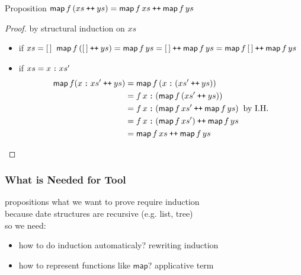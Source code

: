 \documentclass[12pt,aspectratio=169]{beamer}
\newcommand{\m}[1]{\mathsf{#1}}
\newcommand\catenate{\mathbin{\text{\ttfamily\upshape ++}}}
\newcommand\cons{\mathbin{\text{\ttfamily\upshape :}}}
\begin{document}
\begin{frame}
    \begin{block}{Proposition}
        $\m{map}\,f\,(xs \catenate ys) = \m{map} \, f \, xs \catenate \m{map}\,f\,ys$
    \end{block}
    \begin{proof}
        by structural induction on $xs$
        \begin{itemize}
            \item if $xs = [\,]$ $\m{map}\,f\,(\nil \catenate ys) = \m{map}\, f \,ys
                = \nil \catenate \m{map}\,f\,ys = \m{map}\,f\,\nil \catenate \m{map}\,f\,ys$
            \item if $xs = x \cons xs'$
            \setlength{\abovedisplayskip}{1pt}
            \setlength{\belowdisplayskip}{-1pt}
                \begin{align*}
                    \m{map}\,f(x\cons xs' \catenate ys) &= \m{map}\,f\,(x \cons (xs' \catenate ys))\\
                    &= f\,x \cons (\m{map}\,f\,(xs' \catenate ys))\\
                    &= f\,x \cons (\m{map}\,f\,xs' \catenate \m{map}\,f\,ys) \;\;\text{by I.H.}\\
                    &= f\,x \cons (\m{map}\,f\,xs') \catenate \m{map}\,f\,ys\\
                    &= \m{map}\,f\,xs \catenate \m{map}\,f\,ys
                \end{align*}
        \end{itemize}
        \vspace{-6pt}
    \end{proof}
\end{frame}

\begin{frame}
    \frametitle{What is Needed for Tool}
    propositions what we want to prove require \alert{induction}\\
    because date structures are \alert{recursive} (e.g. list, tree)\\
    so we need:
    \begin{figure}
        \centering
    \end{figure}
    \begin{itemize}
        \item how to do induction automaticaly? \quad \alert{rewriting induction}\\
        \item how to represent functions like $\m{map}$? \quad \alert{applicative term}
    \end{itemize}
\end{frame}
\end{document}
